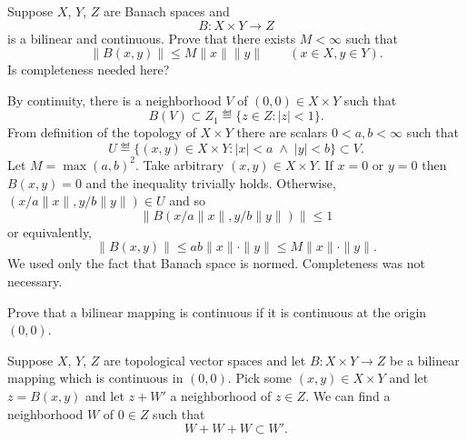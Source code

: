\begin{enumerate}
\begin{excopy}
Suppose $X$, $Y$, $Z$ are Banach spaces and 
\begin{equation*}
B: X\times Y \to Z
\end{equation*}
is a bilinear and continuous. Prove that there exists \(M<\infty\) such that
\begin{equation*}
 \| B(x,y) \| \leq M \|x\| \|y\| \qquad (x\in X, y\in Y).
\end{equation*}
Is completeness needed here?
\end{excopy}

By continuity, there is a neighborhood $V$ of \((0,0)\in X\times Y\)
such that 
\begin{equation*}
B(V) \subset Z_1 \eqdef \{z\in Z: |z| < 1\}.
\end{equation*}
From definition of the topology of \(X\times Y\)
there are scalars \(0<a,b<\infty\) such that
\begin{equation*}
U \eqdef \{(x,y)\in X\times Y: |x| < a\;\wedge\; |y|<b\} \subset V.
\end{equation*}
Let \(M = \max(a, b)^2\).
Take arbitrary \((x,y)\in X\times Y\).
If \(x=0\) or \(y=0\) then \(B(x,y) = 0\) and the inequality
trivially holds.
Otherwise, 
\((x/a\|x\|, y/b\|y\|) \in U\) and so 
\begin{equation*}
\|B(x/a\|x\|, y/b\|y\|)\| \leq 1
\end{equation*}
or equivalently,
\begin{equation*}
\|B(x, y)\| \leq ab\|x\|\cdot\|y\| \leq M\|x\|\cdot\|y\|.
\end{equation*}
We used only the fact that Banach space is normed.
Completeness was not necessary.


\begin{excopy}
Prove that a bilinear mapping is continuous if it is continuous 
at the origin \((0,0)\).
\end{excopy}

Suppose $X$, $Y$, $Z$ are topological vector spaces and 
let \(B: X\times Y \to Z\) be a bilinear mapping which is continuous
in \((0,0)\). Pick some \((x,y)\in X\times Y\)
and let \(z = B(x,y)\) and let \(z + W'\) a neighborhood of \(z\in Z\).
We can find a neighborhood $W$ of \(0\in Z\) such that 
\begin{equation*}
W + W + W \subset W'.
\end{equation*}


\end{enumerate}
